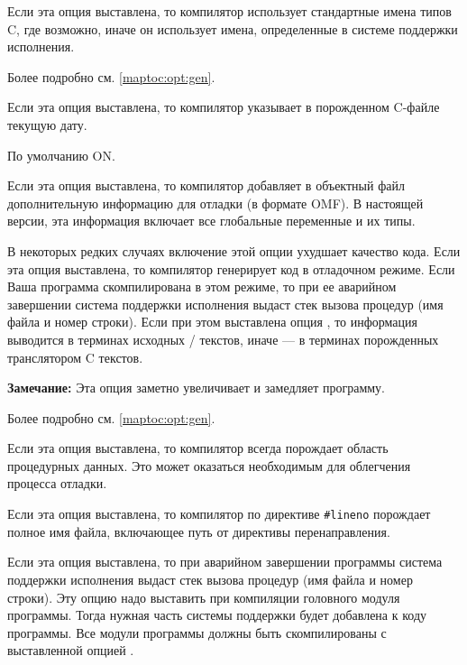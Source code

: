 \begin{description}
Если эта опция выставлена, то компилятор использует стандартные имена
типов C, где возможно, иначе он использует имена, определенные в системе
поддержки исполнения.

Более подробно см. \ref{maptoc:opt:gen}.
\fi

\ifgenc
{}
        \MLBegin{}\ModeC{}\MLEnd{}

Если эта опция выставлена, то компилятор указывает в порожденном C-файле
текущую дату.

По умолчанию ON.
\fi

        \MLBegin{}\ModeC{}\MLEnd{} \header

\ifgencode
Если эта опция выставлена, то компилятор добавляет в объектный файл
дополнительную информацию для отладки (в формате OMF). В настоящей версии,
эта информация включает все глобальные переменные и их типы.

В некоторых редких случаях включение этой опции ухудшает качество кода.
\fi
\ifgenc
Если эта опция выставлена, то компилятор генерирует код в отладочном
режиме. Если Ваша программа скомпилирована в этом режиме, то при
ее  аварийном завершении система поддержки исполнения выдаст стек вызова
процедур (имя файла и номер строки). 
Если при этом выставлена опция , то информация выводится 
в терминах исходных \ot{}/\mt{} текстов, иначе --- в терминах
порожденных транслятором C текстов.

{\bf Замечание:} Эта опция заметно увеличивает и замедляет программу.

Более подробно см. \ref{maptoc:opt:gen}.
\fi

\ifgencode
{}
        \MLBegin{}\ModeC{}\MLEnd{} \header

Если эта опция выставлена, то компилятор 
всегда порождает область процедурных данных. Это может оказаться
необходимым для облегчения процесса отладки.
\fi

\ifgenc
{}
        \MLBegin{}\ModeC{}\MLEnd{}

Если эта опция выставлена, то компилятор по директиве \verb'#lineno'  
порождает полное имя файла, включающее путь от директивы перенаправления.
\fi

        \MLBegin{}\ModeC{}\MLEnd{} \header

Если эта опция выставлена, то при
аварийном завершении программы система поддержки исполнения 
выдаст стек вызова процедур (имя файла и номер строки).
Эту опцию надо выставить при компиляции головного модуля программы.
Тогда нужная часть системы поддержки будет добавлена к коду
программы. Все модули программы должны быть скомпилированы с
выставленной опцией
.


\end{description}
